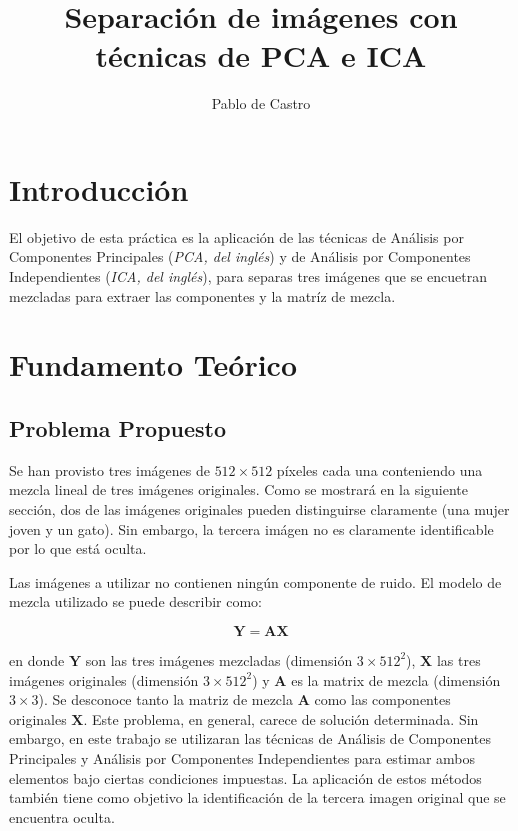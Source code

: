 \documentclass{article}
\title{Separación de imágenes con técnicas de PCA e ICA}
\author{Pablo de Castro}
\begin{document}
    
    
    \maketitle
    
    

    

    \section{Introducción}


    El objetivo de esta práctica es la aplicación de las técnicas de
Análisis por Componentes Principales (\emph{PCA, del inglés}) y de
Análisis por Componentes Independientes (\emph{ICA, del inglés}), para
separas tres imágenes que se encuetran mezcladas para extraer las
componentes y la matríz de mezcla.


    \section{Fundamento Teórico}



    \subsection{Problema Propuesto}


    Se han provisto tres imágenes de \(512\times512\) píxeles cada una
conteniendo una mezcla lineal de tres imágenes originales. Como se
mostrará en la siguiente sección, dos de las imágenes originales pueden
distinguirse claramente (una mujer joven y un gato). Sin embargo, la
tercera imágen no es claramente identificable por lo que está oculta.

Las imágenes a utilizar no contienen ningún componente de ruido. El
modelo de mezcla utilizado se puede describir como:

\[ \mathbf{Y} = \mathbf{A} \mathbf{X} \]

en donde \(\mathbf{Y}\) son las tres imágenes mezcladas (dimensión
\(3\times512^2\)), \(\mathbf{X}\) las tres imágenes originales
(dimensión \(3\times512^2\)) y \(\mathbf{A}\) es la matrix de mezcla
(dimensión \(3\times3\)). Se desconoce tanto la matriz de mezcla
\(\mathbf{A}\) como las componentes originales \(\mathbf{X}\). Este
problema, en general, carece de solución determinada. Sin embargo, en
este trabajo se utilizaran las técnicas de Análisis de Componentes
Principales y Análisis por Componentes Independientes para estimar ambos
elementos bajo ciertas condiciones impuestas. La aplicación de estos
métodos también tiene como objetivo la identificación de la tercera
imagen original que se encuentra oculta.
\end{document}
